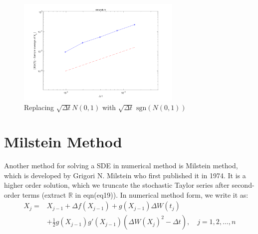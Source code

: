 \documentclass[12pt,a4paper]{article}
\theoremstyle{definition}
\begin{document}
\begin{figure}[htbp]
\centering
\includegraphics[width=0.7\textwidth]{fig/fig7.png}
\caption{\label{fig7} Replacing   $\sqrt{\Delta t}N(0,1)$ with $\sqrt{\Delta t}\text{ sgn}(N(0,1))$ }
\end{figure}



\section{Milstein Method}
Another method for solving a SDE in numerical method is Milstein method, which is developed by Grigori N. Milstein who first published it in 1974. It is a higher order solution, which we truncate the stochastic Taylor series after second-order terms\cite{bayram} (extract $\mathbb{R}$ in eqn(eq19)). In numerical method form, we write it as: \begin{align}
    X_j =& X_{j-1}+\Delta f(X_{j-1})+g(X_{j-1})\Delta W(t_j)\\
    &+\frac{1}{2}g(X_{j-1})g'(X_{j-1})(\Delta W(X_{j})^2 -\Delta t) ,\quad j=1,2,\dots,n\label{milsteineq}
\end{align}
\end{document}
